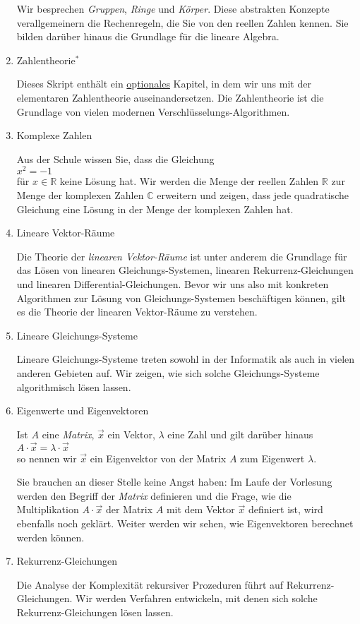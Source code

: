 \begin{enumerate}
      Wir besprechen \emph{Gruppen}, \emph{Ringe} und \emph{Körper}.  Diese abstrakten Konzepte
      verallgemeinern  die Rechenregeln, die Sie von den reellen Zahlen kennen.  Sie bilden darüber
      hinaus die Grundlage für die lineare Algebra.
\item Zahlentheorie$^*$
  
      Dieses Skript enthält ein \underline{o}p\underline{tionales} Kapitel, in dem wir uns mit der 
      elementaren Zahlentheorie auseinandersetzen.  Die Zahlentheorie ist die Grundlage
      von vielen modernen Verschlüsselungs-Algorithmen.
\item Komplexe Zahlen

      Aus der Schule wissen Sie, dass die Gleichung
      \\[0.2cm]
      \hspace*{1.3cm}
      $x^2 = -1$
      \\[0.2cm]
      für $x \in \mathbb{R}$ keine Lösung hat.  Wir werden die Menge der reellen Zahlen $\mathbb{R}$
      zur Menge der komplexen Zahlen $\mathbb{C}$ erweitern und zeigen, dass jede quadratische
      Gleichung eine Lösung in der Menge der komplexen Zahlen hat.
\item Lineare Vektor-Räume

      Die Theorie der \emph{linearen Vektor-Räume} ist unter anderem die Grundlage für das Lösen von linearen
      Gleichungs-Systemen, linearen Rekurrenz-Gleichungen und linearen Differential-Gleichungen.
      Bevor wir uns also mit konkreten Algorithmen zur Lösung von Gleichungs-Systemen beschäftigen
      können, gilt es die Theorie der linearen Vektor-Räume zu verstehen.
\item Lineare Gleichungs-Systeme

      Lineare Gleichungs-Systeme treten sowohl in der Informatik als auch in vielen anderen Gebieten auf. 
      Wir zeigen, wie sich solche Gleichungs-Systeme algorithmisch lösen lassen.
\item Eigenwerte und Eigenvektoren

      Ist $A$ eine \emph{Matrix},  $\vec{x}$ ein Vektor, $\lambda$ eine Zahl und gilt darüber hinaus
      \\[0.2cm]
      \hspace*{1.3cm}
      $A \cdot \vec{x} = \lambda \cdot \vec{x}$
      \\[0.2cm]
      so nennen wir $\vec{x}$ ein Eigenvektor von der Matrix $A$ zum Eigenwert $\lambda$.
      
      Sie brauchen an dieser Stelle keine Angst haben: Im Laufe der Vorlesung werden den Begriff der
      \emph{Matrix} definieren  und die Frage, wie die Multiplikation $A \cdot \vec{x}$ der Matrix $A$ mit
      dem Vektor $\vec{x}$ definiert ist, wird ebenfalls noch geklärt.  Weiter werden wir sehen,
      wie Eigenvektoren berechnet werden können.
\item Rekurrenz-Gleichungen

      Die Analyse der Komplexität rekursiver Prozeduren führt auf Rekurrenz-Gleichungen.
      Wir werden Verfahren entwickeln, mit denen sich solche Rekurrenz-Gleichungen lösen lassen.
\end{enumerate}

